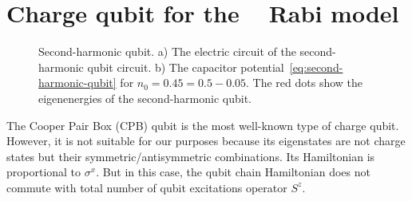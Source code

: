 \documentclass[reprint, aps, prx, amsmath, amssymb, longbibliography, superscriptaddress]{revtex4-2}
\DeclareMathOperator{\Zthree}{\mathbb{Z}_3}
\begin{document}
\section{Charge qubit for the \texorpdfstring{$\Zthree$}{Z3} Rabi model}
\label{app:charge-qubit}


\begin{figure}[t]
    \centering
     \hfill
    \caption{Second-harmonic qubit. a) The electric circuit of the second-harmonic qubit circuit. b) The capacitor potential~\eqref{eq:second-harmonic-qubit} for $n_0 = 0.45 = 0.5 - 0.05 $. The red dots show the eigenenergies of the second-harmonic qubit.}
    \label{fig:second-harmonic-qubit}
\end{figure}


The Cooper Pair Box (CPB) qubit is the most well-known type of charge qubit. However, it is not suitable for our purposes because its eigenstates are not charge states but their symmetric/antisymmetric combinations. Its Hamiltonian is proportional to $\sigma^x$. But in this case, the qubit chain Hamiltonian does not commute with total number of qubit excitations operator $S^z$.
\end{document}
